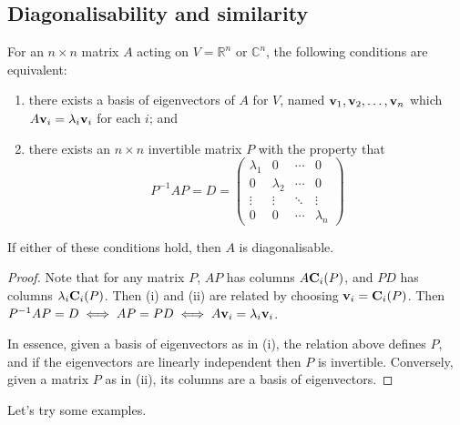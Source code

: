 \subsection{Diagonalisability and similarity}
\begin{proposition}
	For an \(n \times n\) matrix \(A\) acting on \(V = \mathbb R^n\) or \(\mathbb C^n\), the following conditions are equivalent:
	\begin{enumerate}
		\item there exists a basis of eigenvectors of \(A\) for \(V\), named \(\vb v_1, \vb v_2, \dots, \vb v_n\) which \(A\vb v_i = \lambda_i\vb v_i\) for each \(i\); and
		\item there exists an \(n \times n\) invertible matrix \(P\) with the property that
		      \[
			      P^{-1}AP = D = \begin{pmatrix}
				      \lambda_1 & 0         & \cdots & 0         \\
				      0         & \lambda_2 & \cdots & 0         \\
				      \vdots    & \vdots    & \ddots & \vdots    \\
				      0         & 0         & \cdots & \lambda_n
			      \end{pmatrix}
		      \]
	\end{enumerate}
	If either of these conditions hold, then \(A\) is diagonalisable.
\end{proposition}
\begin{proof}
	Note that for any matrix \(P\), \(AP\) has columns \(A\vb C_i(P)\), and \(PD\) has columns \(\lambda_i \vb C_i(P)\).
	Then (i) and (ii) are related by choosing \(\vb v_i = \vb C_i(P)\).
	Then \(P^{-1}AP = D \iff AP = PD \iff A\vb v_i = \lambda_i\vb v_i\).

	In essence, given a basis of eigenvectors as in (i), the relation above defines \(P\), and if the eigenvectors are linearly independent then \(P\) is invertible.
	Conversely, given a matrix \(P\) as in (ii), its columns are a basis of eigenvectors.
\end{proof}
Let's try some examples.
